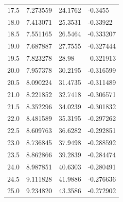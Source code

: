 {{\begin{tabular}{ m{4em} m{4em}  m{4em}  m{4em} }
        17.5 & 7.273559 & 24.1762 & -0.3455 \\[-1em]
        18.0 & 7.413071 & 25.3531 & -0.33922 \\[-1em]
        18.5 & 7.551165 & 26.5464 & -0.333207 \\[-1em]
        19.0 & 7.687887 & 27.7555 & -0.327444 \\[-1em]
        19.5 & 7.823278 & 28.98 & -0.321913 \\[-1em]
        20.0 & 7.957378 & 30.2195 & -0.316599 \\[-1em]
        20.5 & 8.090224 & 31.4735 & -0.311489 \\[-1em]
        21.0 & 8.221852 & 32.7418 & -0.306571 \\[-1em]
        21.5 & 8.352296 & 34.0239 & -0.301832 \\[-1em]
        22.0 & 8.481589 & 35.3195 & -0.297262 \\[-1em]
        22.5 & 8.609763 & 36.6282 & -0.292851 \\[-1em]
        23.0 & 8.736845 & 37.9498 & -0.288592 \\[-1em]
        23.5 & 8.862866 & 39.2839 & -0.284474 \\[-1em]
        24.0 & 8.987851 & 40.6303 & -0.280491 \\[-1em]
        24.5 & 9.111828 & 41.9886 & -0.276636 \\[-1em]
        25.0 & 9.234820 & 43.3586 & -0.272902 \\
		\hline
		\end{tabular}
	}
	\restoregeometry
}



